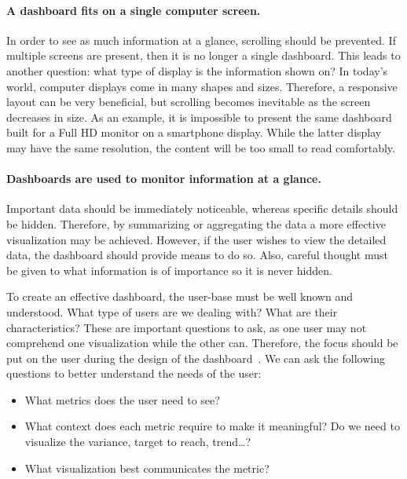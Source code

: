         \paragraph{A dashboard fits on a single computer screen.} In order to see as much information at a glance, scrolling should be prevented. If multiple screens are present, then it is no longer a single dashboard. This leads to another question: what type of display is the information shown on? In today's world, computer displays come in many shapes and sizes. Therefore, a responsive layout can be very beneficial, but scrolling becomes inevitable as the screen decreases in size. As an example, it is impossible to present the same dashboard built for a Full HD monitor on a smartphone display. While the latter display may have the same resolution, the content will be too small to read comfortably.

        \paragraph{Dashboards are used to monitor information at a glance.} Important data should be immediately noticeable, whereas specific details should be hidden. Therefore, by summarizing or aggregating the data a more effective visualization may be achieved. However, if the user wishes to view the detailed data, the dashboard should provide means to do so. Also, careful thought must be given to what information is of importance so it is never hidden.\bigskip

        \noindent To create an effective dashboard, the user-base must be well known and understood. What type of users are we dealing with? What are their characteristics? These are important questions to ask, as one user may not comprehend one visualization while the other can. Therefore, the focus should be put on the user during the design of the dashboard~\cite{Brath2004}. We can ask the following questions to better understand the needs of the user:
        
        \begin{itemize}
            \item What metrics does the user need to see?
            \item What context does each metric require to make it meaningful? Do we need to visualize the variance, target to reach, trend\ldots?
            \item What visualization best communicates the metric?
        \end{itemize}

